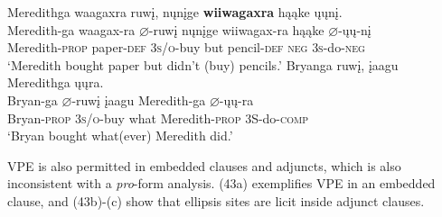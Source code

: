 \documentclass[output=paper]{LSP/langsci}
\begin{document}
\begin{exe}
\ex
\begin{xlist}
\ex 
\glll Meredithga		waagaxra	ruw\k{i},		n\k{u}n\k{i}ge		\textbf{wiiwagaxra}	h\k{a}\k{a}ke	\k{u}\k{u}n\k{i}.\\
Meredith-ga  waagax-ra	 $\varnothing$-ruw\k{i} 	n\k{u}n\k{i}ge		wiiwagax-ra	h\k{a}\k{a}ke $\varnothing$-\k{u}\k{u}-n\k{i} \\
Meredith-\textsc{prop}	paper-\textsc{def}	\textsc{3s/o}-buy	but pencil-\textsc{def} \textsc{neg}	 \textsc{3s}-do-\textsc{neg} \\
\trans `Meredith bought paper but didn't (buy) pencils.'
\ex
\glll  Bryanga			ruw\k{i},				\k{i}aagu		Meredithga			\k{u}\k{u}ra.\\
Bryan-ga			$\varnothing$-ruw\k{i}	\k{i}aagu		Meredith-ga	$\varnothing$-\k{u}\k{u}-ra \\
	Bryan-\textsc{prop}	\textsc{3s/o}-buy		what		Meredith-\textsc{prop}		3S-do-\textsc{comp} \\
\trans `Bryan bought what(ever) Meredith did.'
\end{xlist}
\end{exe}

VPE is also permitted in embedded clauses and adjuncts, which is also inconsistent with a \textit{pro}-form analysis. (43a) exemplifies VPE in an embedded clause, and (43b)-(c) show that ellipsis sites are licit inside adjunct clauses.
\end{document}
